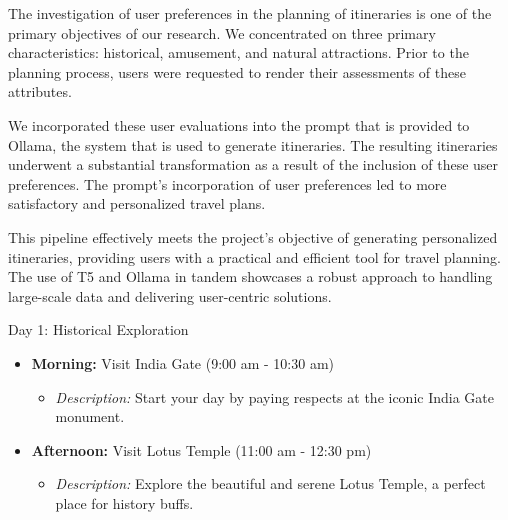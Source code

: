 \documentclass[conference]{IEEEtran}
\begin{document}
        The investigation of user preferences in the planning of itineraries is one of the primary objectives of our research. We concentrated on three primary characteristics: historical, amusement, and natural attractions. Prior to the planning process, users were requested to render their assessments of these attributes.{\\}

        We incorporated these user evaluations into the prompt that is provided to Ollama, the system that is used to generate itineraries. The resulting itineraries underwent a substantial transformation as a result of the inclusion of these user preferences. The prompt's incorporation of user preferences led to more satisfactory and personalized travel plans.{\\}

        This pipeline effectively meets the project's objective of generating personalized itineraries, providing users with a practical and efficient tool for travel planning. The use of T5 and Ollama in tandem showcases a robust approach to handling large-scale data and delivering user-centric solutions.

        \begin{tcolorbox}[colframe=black!75!white, colback=white!90!black, title=Sample One-Day Itinerary with user preferences]
        Day 1: Historical Exploration
            \begin{itemize}
                \item \textbf{Morning:} Visit India Gate (9:00 am - 10:30 am)
                \begin{itemize}
                    \item \textit{Description:} Start your day by paying respects at the iconic India Gate monument.
                \end{itemize}
                \item \textbf{Afternoon:} Visit Lotus Temple (11:00 am - 12:30 pm)
                \begin{itemize}
                    \item \textit{Description:} Explore the beautiful and serene Lotus Temple, a perfect place for history buffs.
                \end{itemize}
            \end{itemize}
        \end{tcolorbox}
\end{document}
